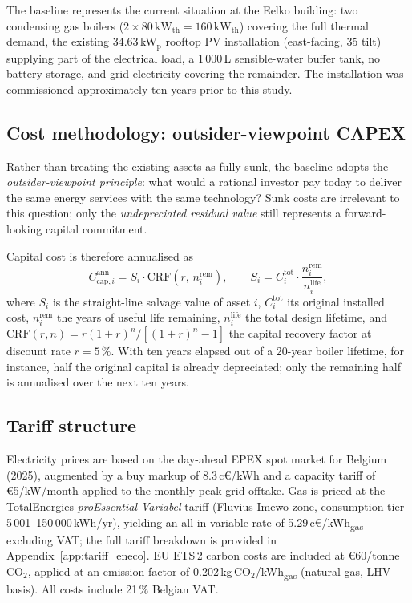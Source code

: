 \documentclass[11pt,a4paper]{report}
\begin{document}
The baseline represents the current situation at the Eelko building: two condensing
gas boilers ($2 \times 80\,\mathrm{kW_{th}} = 160\,\mathrm{kW_{th}}$) covering the
full thermal demand, the existing 34.63\,kW$_\mathrm{p}$ rooftop PV installation
(east-facing, 35\degree{} tilt) supplying part of the electrical load, a
1\,000\,L sensible-water buffer tank, no battery storage, and grid electricity
covering the remainder.
The installation was commissioned approximately ten years prior to this study.

\subsection*{Cost methodology: outsider-viewpoint CAPEX}

Rather than treating the existing assets as fully sunk, the baseline adopts the
\emph{outsider-viewpoint principle}: what would a rational investor pay today to
deliver the same energy services with the same technology?
Sunk costs are irrelevant to this question; only the \emph{undepreciated residual
value} still represents a forward-looking capital commitment.

Capital cost is therefore annualised as
\begin{equation}
  C_{\mathrm{cap},i}^{\mathrm{ann}}
    = S_i \cdot \mathrm{CRF}(r,\, n_i^{\mathrm{rem}}),
  \qquad
  S_i = C_i^{\mathrm{tot}} \cdot \frac{n_i^{\mathrm{rem}}}{n_i^{\mathrm{life}}},
  \label{eq:baseline_capex}
\end{equation}
where $S_i$ is the straight-line salvage value of asset $i$,
$C_i^{\mathrm{tot}}$ its original installed cost,
$n_i^{\mathrm{rem}}$ the years of useful life remaining,
$n_i^{\mathrm{life}}$ the total design lifetime, and
$\mathrm{CRF}(r, n) = r(1+r)^n / [(1+r)^n - 1]$ the capital recovery factor
at discount rate $r = 5\,\%$.
With ten years elapsed out of a 20-year boiler lifetime, for instance, half the
original capital is already depreciated; only the remaining half is annualised
over the next ten years.

\subsection*{Tariff structure}

Electricity prices are based on the day-ahead EPEX spot market for Belgium (2025),
augmented by a buy markup of 8.3\,c\euro{}/kWh and a capacity tariff of
\euro{}5/kW/month applied to the monthly peak grid offtake.
Gas is priced at the TotalEnergies \emph{proEssential Variabel} tariff
(Fluvius Imewo zone, consumption tier 5\,001--150\,000\,kWh/yr), yielding an
all-in variable rate of 5.29\,c\euro{}/kWh\textsubscript{gas} excluding VAT;
the full tariff breakdown is provided in Appendix~\ref{app:tariff_eneco}.
EU ETS\,2 carbon costs are included at \euro{}60/tonne\,CO$_2$, applied at an
emission factor of 0.202\,kg\,CO$_2$/kWh\textsubscript{gas} (natural gas, LHV
basis).
All costs include 21\,\% Belgian VAT.
\end{document}
